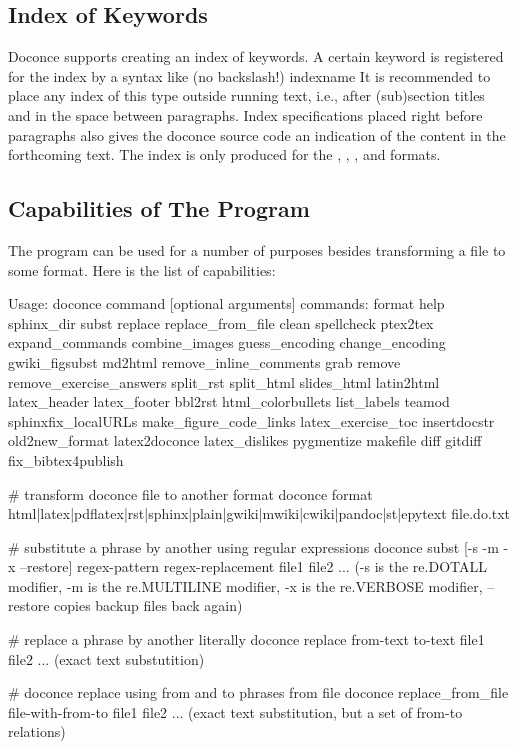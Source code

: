 \documentclass[%
oneside,                 %
final,                   %
10pt]{article}
\begin{document}
\subsection{Index of Keywords}

Doconce supports creating an index of keywords. A certain keyword
is registered for the index by a syntax like (no
backslash!)
\bccq
index{name}
\eccq
It is recommended to place any index of this type outside
running text, i.e., after (sub)section titles and in the space between
paragraphs. Index specifications placed right before paragraphs also
gives the doconce source code an indication of the content in the
forthcoming text. The index is only produced for the ,
, , and  formats.

\subsection{Capabilities of The Program \protect{} }

The  program can be used for a number of purposes besides
transforming a  file to some format. Here is the
list of capabilities:

\bshpro
Usage: doconce command [optional arguments]
commands: format help sphinx_dir subst replace replace_from_file clean spellcheck ptex2tex expand_commands combine_images guess_encoding change_encoding gwiki_figsubst md2html remove_inline_comments grab remove remove_exercise_answers split_rst split_html slides_html latin2html latex_header latex_footer bbl2rst html_colorbullets list_labels teamod sphinxfix_localURLs make_figure_code_links latex_exercise_toc insertdocstr old2new_format latex2doconce latex_dislikes pygmentize makefile diff gitdiff fix_bibtex4publish


# transform doconce file to another format
doconce format html|latex|pdflatex|rst|sphinx|plain|gwiki|mwiki|cwiki|pandoc|st|epytext file.do.txt

# substitute a phrase by another using regular expressions
doconce subst [-s -m -x --restore] regex-pattern regex-replacement file1 file2 ...
(-s is the re.DOTALL modifier, -m is the re.MULTILINE modifier,
 -x is the re.VERBOSE modifier, --restore copies backup files back again)

# replace a phrase by another literally
doconce replace from-text to-text file1 file2 ...
(exact text substutition)

# doconce replace using from and to phrases from file
doconce replace_from_file file-with-from-to file1 file2 ...
(exact text substitution, but a set of from-to relations)
\end{document}
